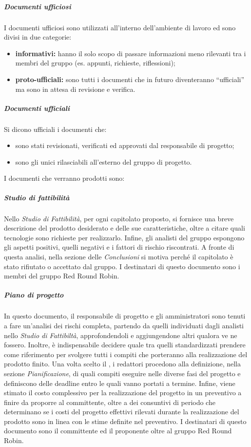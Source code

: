 				\subparagraph{Documenti ufficiosi}
					I documenti ufficiosi sono utilizzati all'interno dell'ambiente di lavoro ed sono divisi in due categorie:
					\begin{itemize}
						\item \textbf{informativi:} hanno il solo scopo di passare informazioni meno rilevanti tra i membri del gruppo (es. appunti, richieste, riflessioni);
						\item \textbf{proto-ufficiali:} sono tutti i documenti che in futuro diventeranno ``ufficiali'' ma sono in attesa di revisione e verifica.
					\end{itemize}
				\subparagraph{Documenti ufficiali}
					Si dicono ufficiali i documenti che:
					\begin{itemize}
						\item sono stati revisionati, verificati ed approvati dal responsabile di progetto;
						\item sono gli unici rilasciabili all'esterno del gruppo di progetto.
					\end{itemize}
					I documenti che verranno prodotti sono:
				\subparagraph{Studio di fattibilità}
					Nello \textit{Studio di Fattibilità}, per ogni capitolato proposto, si fornisce una breve descrizione del prodotto desiderato e delle sue caratteristiche, oltre a citare quali tecnologie sono richieste per realizzarlo. Infine, gli analisti del gruppo espongono gli aspetti positivi, quelli negativi e i fattori di rischio riscontrati. A fronte di questa analisi, nella sezione delle \textit{Conclusioni} si motiva perché il capitolato è stato rifiutato o accettato dal gruppo. I destinatari di questo documento sono i membri del gruppo Red Round Robin. 
				\subparagraph{Piano di progetto}
					In questo documento, il responsabile di progetto e gli amministratori sono tenuti a fare un'analisi dei rischi completa, partendo da quelli individuati dagli analisti nello \textit{Studio di Fattibiltà}, approfondendoli e aggiungendone altri qualora ve ne fossero. Inoltre, è indispensabile decidere quale  tra quelli standardizzati prendere come riferimento per svolgere tutti i compiti che porteranno alla realizzazione del prodotto finito. Una volta scelto il , i redattori procedono alla definizione, nella sezione \textit{Pianificazione}, di quali compiti eseguire nelle diverse fasi del progetto e definiscono delle deadline entro le quali vanno portati a termine. Infine, viene stimato il costo complessivo per la realizzazione del progetto in un preventivo a finire da proporre al committente, oltre a dei consuntivi di periodo che determinano se i costi del progetto effettivi rilevati durante la realizzazione del prodotto sono in linea con le stime definite nel preventivo. I destinatari di questo documento sono il committente ed il proponente oltre al gruppo Red Round Robin.
